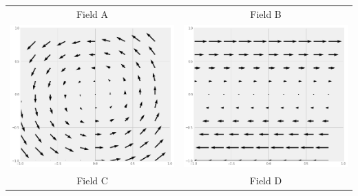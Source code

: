 \documentclass[
  letterpaperpaper,
]{article}
\begin{document}
\begin{longtable}[]{@{}cc@{}}
\toprule
\endhead
Field A & Field B\tabularnewline
\includegraphics{./images/hw1/A.png} &
\includegraphics{./images/hw1/B.png}\tabularnewline
Field C & Field D\tabularnewline

\end{longtable}
\end{document}
